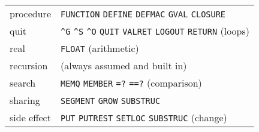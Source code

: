 \documentclass[a4paper,]{article}
\begin{document}
\begin{longtable}[]{@{}ll@{}}
\begin{minipage}[t]{0.11\columnwidth}
procedure\strut
\end{minipage} & \begin{minipage}[t]{0.83\columnwidth}\raggedright\strut
\texttt{FUNCTION} \texttt{DEFINE} \texttt{DEFMAC} \texttt{GVAL} \texttt{CLOSURE}\strut
\end{minipage}\tabularnewline
\begin{minipage}[t]{0.11\columnwidth}\raggedright\strut
quit\strut
\end{minipage} & \begin{minipage}[t]{0.83\columnwidth}\raggedright\strut
\texttt{\^{}G} \texttt{\^{}S} \texttt{\^{}O} \texttt{QUIT} \texttt{VALRET} \texttt{LOGOUT} \texttt{RETURN} (loops)\strut
\end{minipage}\tabularnewline
\begin{minipage}[t]{0.11\columnwidth}\raggedright\strut
real\strut
\end{minipage} & \begin{minipage}[t]{0.83\columnwidth}\raggedright\strut
\texttt{FLOAT} (arithmetic)\strut
\end{minipage}\tabularnewline
\begin{minipage}[t]{0.11\columnwidth}\raggedright\strut
recursion\strut
\end{minipage} & \begin{minipage}[t]{0.83\columnwidth}\raggedright\strut
(always assumed and built in)\strut
\end{minipage}\tabularnewline
\begin{minipage}[t]{0.11\columnwidth}\raggedright\strut
search\strut
\end{minipage} & \begin{minipage}[t]{0.83\columnwidth}\raggedright\strut
\texttt{MEMQ} \texttt{MEMBER} \texttt{=?} \texttt{==?} (comparison)\strut
\end{minipage}\tabularnewline
\begin{minipage}[t]{0.11\columnwidth}\raggedright\strut
sharing\strut
\end{minipage} & \begin{minipage}[t]{0.83\columnwidth}\raggedright\strut
\texttt{SEGMENT} \texttt{GROW} \texttt{SUBSTRUC}\strut
\end{minipage}\tabularnewline
\begin{minipage}[t]{0.11\columnwidth}\raggedright\strut
side effect\strut
\end{minipage} & \begin{minipage}[t]{0.83\columnwidth}\raggedright\strut
\texttt{PUT} \texttt{PUTREST} \texttt{SETLOC} \texttt{SUBSTRUC} (change)\strut

\end{minipage}
\end{longtable}
\end{document}
